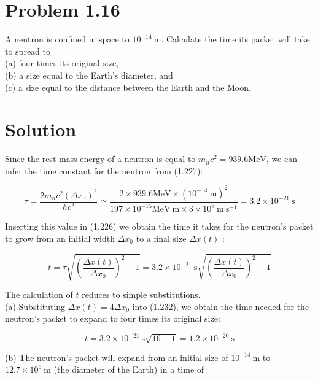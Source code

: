 \documentclass[10pt]{article}
\begin{document}
\section*{Problem 1.16}
A neutron is confined in space to $10^{-14} \mathrm{~m}$. Calculate the time its packet will take to spread to\\
(a) four times its original size,\\
(b) a size equal to the Earth's diameter, and\\
(c) a size equal to the distance between the Earth and the Moon.

\section*{Solution}
Since the rest mass energy of a neutron is equal to $m_{n} c^{2}=939.6 \mathrm{MeV}$, we can infer the time constant for the neutron from (1.227):


\begin{equation*}
\tau=\frac{2 m_{n} c^{2}\left(\Delta x_{0}\right)^{2}}{\hbar c^{2}} \simeq \frac{2 \times 939.6 \mathrm{MeV} \times\left(10^{-14} \mathrm{~m}\right)^{2}}{197 \times 10^{-15} \mathrm{MeV} \mathrm{~m} \times 3 \times 10^{8} \mathrm{~m} \mathrm{~s}^{-1}}=3.2 \times 10^{-21} \mathrm{~s} \tag{1.231}
\end{equation*}


Inserting this value in (1.226) we obtain the time it takes for the neutron's packet to grow from an initial width $\Delta x_{0}$ to a final size $\Delta x(t)$ :


\begin{equation*}
t=\tau \sqrt{\left(\frac{\Delta x(t)}{\Delta x_{0}}\right)^{2}-1}=3.2 \times 10^{-21} \mathrm{~s} \sqrt{\left(\frac{\Delta x(t)}{\Delta x_{0}}\right)^{2}-1} \tag{1.232}
\end{equation*}


The calculation of $t$ reduces to simple substitutions.\\
(a) Substituting $\Delta x(t)=4 \Delta x_{0}$ into (1.232), we obtain the time needed for the neutron's packet to expand to four times its original size:


\begin{equation*}
t=3.2 \times 10^{-21} \mathrm{~s} \sqrt{16-1}=1.2 \times 10^{-20} \mathrm{~s} \tag{1.233}
\end{equation*}


(b) The neutron's packet will expand from an initial size of $10^{-14} \mathrm{~m}$ to $12.7 \times 10^{6} \mathrm{~m}$ (the diameter of the Earth) in a time of
\end{document}
